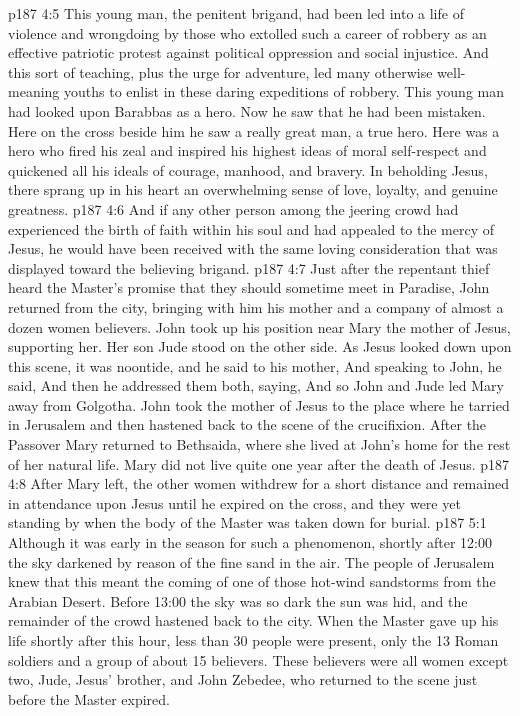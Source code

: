 \vs p187 4:5 \pc This young man, the penitent brigand, had been led into a life of violence and wrongdoing by those who extolled such a career of robbery as an effective patriotic protest against political oppression and social injustice. And this sort of teaching, plus the urge for adventure, led many otherwise well\hyp{}meaning youths to enlist in these daring expeditions of robbery. This young man had looked upon Barabbas as a hero. Now he saw that he had been mistaken. Here on the cross beside him he saw a really great man, a true hero. Here was a hero who fired his zeal and inspired his highest ideas of moral self\hyp{}respect and quickened all his ideals of courage, manhood, and bravery. In beholding Jesus, there sprang up in his heart an overwhelming sense of love, loyalty, and genuine greatness.
\vs p187 4:6 And if any other person among the jeering crowd had experienced the birth of faith within his soul and had appealed to the mercy of Jesus, he would have been received with the same loving consideration that was displayed toward the believing brigand.
\vs p187 4:7 \pc Just after the repentant thief heard the Master’s promise that they should sometime meet in Paradise, John returned from the city, bringing with him his mother and a company of almost a dozen women believers. John took up his position near Mary the mother of Jesus, supporting her. Her son Jude stood on the other side. As Jesus looked down upon this scene, it was noontide, and he said to his mother,  And speaking to John, he said,  And then he addressed them both, saying,  And so John and Jude led Mary away from Golgotha. John took the mother of Jesus to the place where he tarried in Jerusalem and then hastened back to the scene of the crucifixion. After the Passover Mary returned to Bethsaida, where she lived at John’s home for the rest of her natural life. Mary did not live quite one year after the death of Jesus.
\vs p187 4:8 After Mary left, the other women withdrew for a short distance and remained in attendance upon Jesus until he expired on the cross, and they were yet standing by when the body of the Master was taken down for burial.
\vs p187 5:1 Although it was early in the season for such a phenomenon, shortly after 12:00 the sky darkened by reason of the fine sand in the air. The people of Jerusalem knew that this meant the coming of one of those hot\hyp{}wind sandstorms from the Arabian Desert. Before 13:00 the sky was so dark the sun was hid, and the remainder of the crowd hastened back to the city. When the Master gave up his life shortly after this hour, less than 30 people were present, only the 13 Roman soldiers and a group of about 15 believers. These believers were all women except two, Jude, Jesus’ brother, and John Zebedee, who returned to the scene just before the Master expired.
